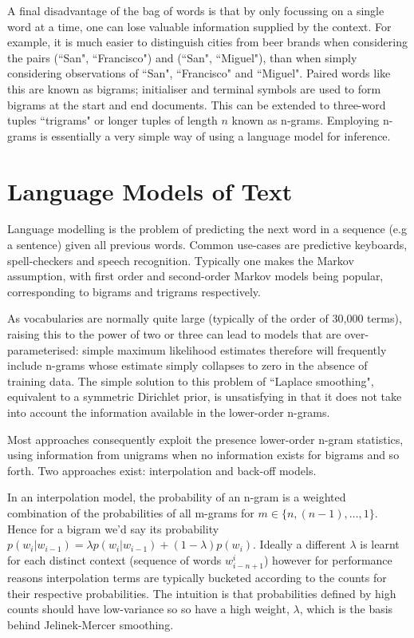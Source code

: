A final disadvantage of the bag of words is that by only focussing on a single word at a time, one can lose valuable information supplied by the context. For example, it is much easier to distinguish cities from beer brands when considering the pairs (``San", ``Francisco") and (``San", ``Miguel"), than when simply considering observations of ``San", ``Francisco" and ``Miguel". Paired words like this are known as bigrams; initialiser and terminal symbols are used to form bigrams at the start and end documents. This can be extended to three-word tuples ``trigrams" or longer tuples of length $n$ known as n-grams. Employing n-grams is essentially a very simple way of using a language model for inference.


\section{Language Models of Text}
\label{sec:langmodels}
Language modelling is the problem of predicting the next word in a sequence (e.g a sentence) given all previous words. Common use-cases are predictive keyboards, spell-checkers and speech recognition. Typically one makes the Markov assumption, with first order and second-order Markov models being popular, corresponding to bigrams and trigrams respectively.

As vocabularies are normally quite large (typically of the order of 30,000 terms), raising this to the power of two or three can lead to models that are over-parameterised: simple maximum likelihood estimates therefore will frequently include n-grams whose estimate simply collapses to zero in the absence of training data. The simple solution to this problem  of ``Laplace smoothing", equivalent to a symmetric Dirichlet prior, is unsatisfying in that it does not take into account the information available in the lower-order n-grams.

Most approaches consequently exploit the presence lower-order n-gram statistics, using information from unigrams when no information exists for bigrams and so forth. Two approaches exist: interpolation and back-off models.

In an interpolation model, the probability of an n-gram is a weighted combination of the probabilities of all m-grams for $m \in \{n, (n-1), \ldots, 1\}$. Hence for a bigram we'd say its probability $p(w_i|w_{i-1}) = \lambda p(w_i|w_{i-1}) + (1 - \lambda) p(w_i)$. Ideally a different $\lambda$ is learnt for each distinct context (sequence of words $w^i_{i-n+1}$) however for performance reasons interpolation terms are typically bucketed according to the counts for their respective probabilities. The intuition is that probabilities defined by high counts should have low-variance so so have a high weight, $\lambda$, which is the basis behind Jelinek-Mercer smoothing\cite{JelinekMercer1980}.

